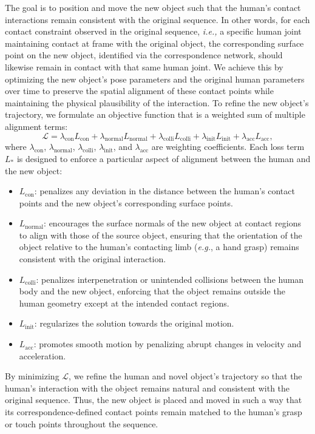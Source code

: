 The goal is to position and move the new object such that the human’s contact interactions remain consistent with the original sequence. In other words, for each contact constraint observed in the original sequence, \textit{i.e.,} a specific human joint maintaining contact at frame with the original object, the corresponding surface point on the new object, identified via the correspondence network, should likewise remain in contact with that same human joint. We achieve this by optimizing the new object’s pose parameters and the original human parameters over time to preserve the spatial alignment of these contact points while maintaining the physical plausibility of the interaction. To refine the new object’s trajectory, we formulate an objective function that is a weighted sum of multiple alignment terms:
\begin{equation}
\mathcal{L}= \lambda_{\text{con}}L_{\text{con}} + \lambda_{\text{normal}}L_{\text{normal}} + \lambda_{\text{colli}}L_{\text{colli}} + \lambda_{\text{init}}L_{\text{init}} + \lambda_{\text{acc}}L_{\text{acc}},
\end{equation}
where $\lambda_{\text{con}}$, $\lambda_{\text{normal}}$, $\lambda_{\text{colli}}$, $\lambda_{\text{init}}$, and $\lambda_{\text{acc}}$ are weighting coefficients. Each loss term $L_{\ast}$ is designed to enforce a particular aspect of alignment between the human and the new object:
\begin{itemize}\setlength\itemsep{0em}
\item $L_{\text{con}}$: penalizes any deviation in the distance between the human’s contact points and the new object’s corresponding surface points.
\item $L_{\text{normal}}$: encourages the surface normals of the new object at contact regions to align with those of the source object, ensuring that the orientation of the object relative to the human’s contacting limb (\textit{e.g.}, a hand grasp) remains consistent with the original interaction.
\item $L_{\text{colli}}$: penalizes interpenetration or unintended collisions between the human body and the new object, enforcing that the object remains outside the human geometry except at the intended contact regions.
\item $L_{\text{init}}$: regularizes the solution towards the original motion.
\item $L_{\text{acc}}$: promotes smooth motion by penalizing abrupt changes in velocity and acceleration.
\end{itemize}
By minimizing $\mathcal{L}$, we refine the human and novel object’s trajectory so that the human’s interaction with the object remains natural and consistent with the original sequence. Thus, the new object is placed and moved in such a way that its correspondence-defined contact points remain matched to the human’s grasp or touch points throughout the sequence.

